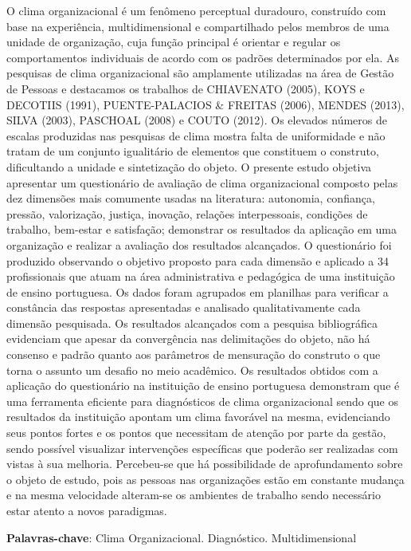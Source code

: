 \documentclass[article,12pt,onesidea,4paper,english,brazil]{abntex2}
\begin{document}
	\noindent O clima organizacional é um fenômeno perceptual duradouro, construído com base na experiência, multidimensional e compartilhado pelos membros de uma unidade de organização, cuja função principal é orientar e regular os comportamentos individuais de acordo com os padrões determinados por ela. As pesquisas de clima organizacional são amplamente utilizadas na área de Gestão de Pessoas e destacamos os trabalhos de CHIAVENATO (2005), KOYS e DECOTIIS (1991), PUENTE-PALACIOS \& FREITAS (2006), MENDES (2013), SILVA (2003), PASCHOAL (2008) e COUTO (2012). Os elevados números de escalas produzidas nas pesquisas de clima mostra falta de uniformidade e não tratam de um conjunto igualitário de elementos que constituem o construto, dificultando a unidade e sintetização do objeto. O presente estudo objetiva apresentar um questionário de avaliação de clima organizacional composto pelas dez dimensões mais comumente usadas na literatura: autonomia, confiança, pressão, valorização, justiça, inovação, relações interpessoais, condições de trabalho, bem-estar e satisfação; demonstrar os resultados da aplicação em uma organização e realizar a avaliação dos resultados alcançados. O questionário foi produzido observando o objetivo proposto para cada dimensão e aplicado a 34 profissionais que atuam na área administrativa e pedagógica de uma instituição de ensino portuguesa. Os dados foram agrupados em planilhas para verificar a constância das respostas apresentadas e analisado qualitativamente cada dimensão pesquisada. Os resultados alcançados com a pesquisa bibliográfica evidenciam que apesar da convergência nas delimitações do objeto, não há consenso e padrão quanto aos parâmetros de mensuração do construto o que torna o assunto um desafio no meio acadêmico. Os resultados obtidos com a aplicação do questionário na instituição de ensino portuguesa demonstram que é uma ferramenta eficiente para diagnósticos de clima organizacional sendo que os resultados da instituição apontam um clima favorável na mesma, evidenciando seus pontos fortes e os pontos que necessitam de atenção por parte da gestão, sendo possível visualizar intervenções específicas que poderão ser realizadas com vistas à sua melhoria. Percebeu-se que há possibilidade de aprofundamento sobre o objeto de estudo, pois as pessoas nas organizações estão em constante mudança e na mesma velocidade alteram-se os ambientes de trabalho sendo necessário estar atento a novos paradigmas.
	
	\vspace{\onelineskip}
	
	\noindent
	\textbf{Palavras-chave}: Clima Organizacional. Diagnóstico. Multidimensional
	
\end{document}
